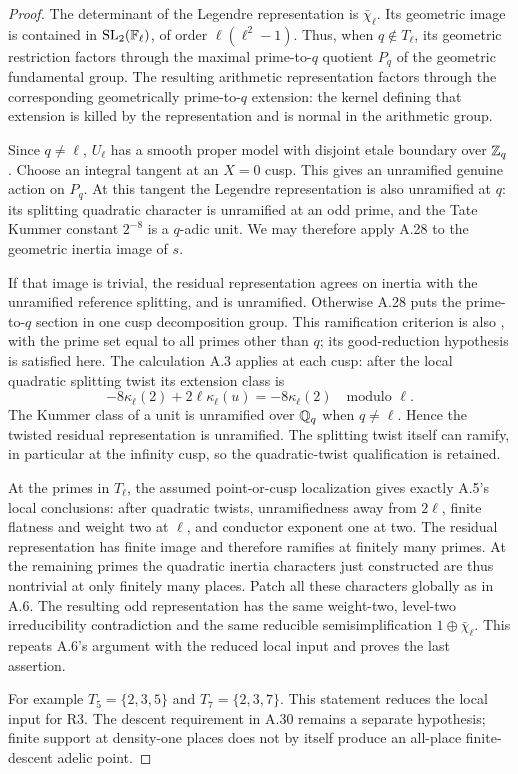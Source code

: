 \begin{proof}
The determinant of the Legendre representation is $\bar\chi_\ell$.
Its geometric image is contained in $\mathrm{SL}_2(\mathbb F_\ell)$, of order
$\ell(\ell^2-1)$. Thus, when $q\notin T_\ell$, its geometric restriction
factors through the maximal prime-to-$q$ quotient $P_q$ of the geometric
fundamental group. The resulting arithmetic representation factors
through the corresponding geometrically prime-to-$q$ extension: the
kernel defining that extension is killed by the representation and is
normal in the arithmetic group.

Since $q\ne\ell$, $U_\ell$ has a smooth proper model with disjoint etale
boundary over $\mathbb Z_q$. Choose an integral tangent at an $X=0$ cusp.
This gives an unramified genuine action on $P_q$. At this tangent the
Legendre representation is also unramified at $q$: its splitting
quadratic character is unramified at an odd prime, and the Tate Kummer
constant $2^{-8}$ is a $q$-adic unit. We may therefore apply A.28 to the
geometric inertia image of $s$.

If that image is trivial, the residual representation agrees on inertia
with the unramified reference splitting, and is unramified. Otherwise
A.28 puts the prime-to-$q$ section in one cusp decomposition group.
This ramification criterion is also
\citet[Appendix A, Proposition A.6]{AMHoshi2012}, with the prime set
equal to all primes other than $q$; its good-reduction hypothesis is
satisfied here. The calculation A.3 applies at each cusp: after the
local quadratic splitting twist its extension class is
\[
 -8\kappa_\ell(2)+2\ell\kappa_\ell(u)
 =-8\kappa_\ell(2)\quad\text{modulo }\ell.
\]
The Kummer class of a unit is unramified over $\mathbb Q_q$ when $q\ne\ell$.
Hence the twisted residual representation is unramified. The splitting
twist itself can ramify, in particular at the infinity cusp, so the
quadratic-twist qualification is retained.

At the primes in $T_\ell$, the assumed point-or-cusp localization gives
exactly A.5's local conclusions: after quadratic twists, unramifiedness
away from $2\ell$, finite flatness and weight two at $\ell$, and conductor
exponent one at two. The residual representation has finite image and
therefore ramifies at finitely many primes. At the remaining primes the
quadratic inertia characters just constructed are thus nontrivial at
only finitely many places. Patch all these characters globally as in
A.6. The resulting odd representation has the same weight-two,
level-two irreducibility contradiction and the same reducible
semisimplification $1\oplus\bar\chi_\ell$. This repeats A.6's argument
with the reduced local input and proves the last assertion.

For example $T_5=\{2,3,5\}$ and $T_7=\{2,3,7\}$. This statement
reduces the local input for R3. The descent requirement in A.30 remains
a separate hypothesis; finite support at density-one places does not
by itself produce an all-place finite-descent adelic point.
\end{proof}



